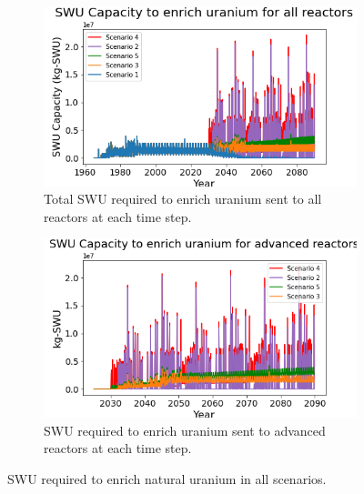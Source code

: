 \begin{figure}
    \centering
    \begin{subfigure}{0.45\textwidth}
        \centering
        \includegraphics[scale=0.4]{../figures/totalswu_scenarios_all.png}
        \caption{Total \gls{SWU} required to enrich uranium sent to all reactors at each time step.}
        \label{fig:totalswu_all}
    \end{subfigure}
    \hspace{0.8cm}
    \begin{subfigure}{0.45\textwidth}
        \centering
        \includegraphics[scale=0.4]{../figures/haleuSWU_scenarios_all.png}
        \caption{\gls{SWU} required to enrich uranium sent to advanced reactors at each time step.}
        \label{fig:haleuswu_al}
    \end{subfigure}
    \caption{\gls{SWU} required to enrich natural uranium in all scenarios.}
    \label{fig:swu_all}
\end{figure}

